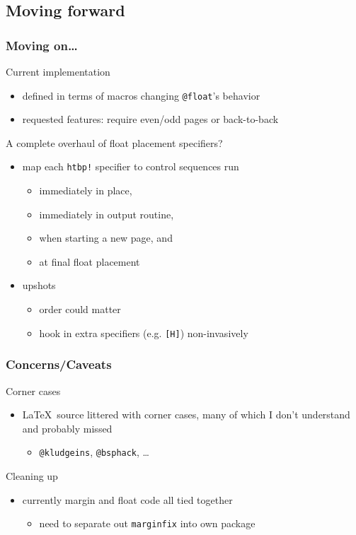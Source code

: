 \documentclass{beamer}
\def\cs#1{\texttt{\expandafter\string\csname#1\endcsname}}
\begin{document}
\subsection{Moving forward}
\begin{frame}
  \frametitle{Moving on\ldots}
  \begin{block}{Current implementation}
    \begin{itemize}
    \item defined in terms of macros changing \cs{@float}'s behavior
    \item requested features: require even/odd pages or back-to-back
    \end{itemize}
  \end{block}
  \begin{block}{A complete overhaul of float placement specifiers?}
    \begin{itemize}
    \item map each \texttt{htbp!} specifier to control sequences run
      \begin{itemize}
      \item immediately in place,
      \item immediately in output routine,
      \item when starting a new page, and
      \item at final float placement
      \end{itemize}
    \item upshots
      \begin{itemize}
      \item order could matter
      \item hook in extra specifiers (e.g. \texttt{[H]}) non-invasively
      \end{itemize}
    \end{itemize}
  \end{block}
\end{frame}

\begin{frame}
  \frametitle{Concerns/Caveats}
  \begin{block}{Corner cases}
    \begin{itemize}
    \item \LaTeX\ source littered with corner cases, many of which
      I don't understand and probably missed 
      \begin{itemize}
      \item \cs{@kludgeins}, \cs{@bsphack}, \ldots
      \end{itemize}
    \end{itemize}
  \end{block}
  \begin{block}{Cleaning up}
    \begin{itemize}
    \item currently margin and float code all tied together
      \begin{itemize}
      \item need to separate out \texttt{marginfix} into own package
      \end{itemize}
    \end{itemize}
  \end{block}
\end{frame}
\end{document}
